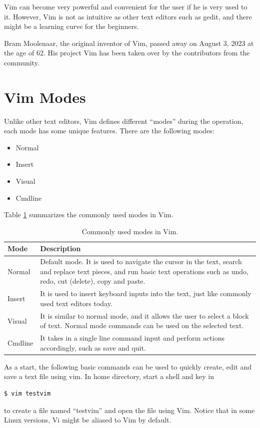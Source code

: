 Vim can become very powerful and convenient for the user if he is very used to it. However, Vim is not as intuitive as other text editors such as gedit, and there might be a learning curve for the beginners.

Bram Moolenaar, the original inventor of Vim, passed away on August 3, 2023 at the age of 62. His project Vim has been taken over by the contributors from the community. 

\section{Vim Modes} \label{ch:tfe:subsec:vimgeneralintro}

Unlike other text editors, Vim defines different ``modes'' during the operation, each mode has some unique features. There are the following modes:
\begin{itemize}
  \item Normal
  \item Insert
  \item Visual
  \item Cmdline
\end{itemize}
Table \ref{ch:tfe:tab:vimmodes} summarizes the commonly used modes in Vim.
\begin{table}
  \centering \caption{Commonly used modes in Vim.}\label{ch:tfe:tab:vimmodes}
  \begin{tabularx}{\textwidth}{lX}
    \hline
    Mode & Description \\ \hline
    Normal & Default mode. It is used to navigate the cursor in the text, search and replace text pieces, and run basic text operations such as undo, redo, cut (delete), copy and paste. \\ 
    Insert & It is used to insert keyboard inputs into the text, just like commonly used text editors today. \\ 
    Visual & It is similar to normal mode, and it allows the user to select a block of text. Normal mode commands can be used on the selected text. \\ 
    Cmdline & It takes in a single line command input and perform actions accordingly, such as save and quit. \\
    \hline
  \end{tabularx}
\end{table}

As a start, the following basic commands can be used to quickly create, edit and save a text file using vim. In home directory, start a shell and key in
\begin{lstlisting}
$ vim testvim
\end{lstlisting}
to create a file named ``testvim'' and open the file using Vim. Notice that in some Linux versions, Vi might be aliased to Vim by default.

